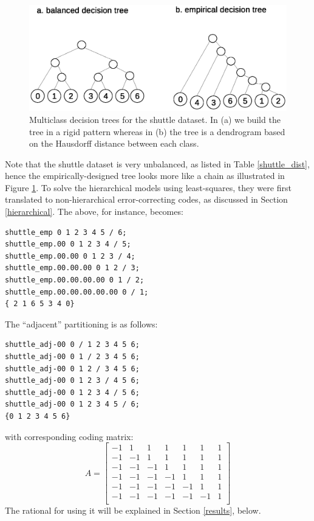 \begin{figure}
	\includegraphics[width=\textwidth]{shuttle_tree.eps}
	\caption{Multiclass decision trees for the shuttle dataset. 
	In (a) we build the tree in a rigid pattern whereas in (b) the tree is a dendrogram based on the Hausdorff distance between each class.}\label{shuttle_tree}
\end{figure}

Note that the shuttle dataset is very unbalanced, 
as listed in Table \ref{shuttle_dist},
hence  the empirically-designed tree looks more like a chain
as illustrated in Figure \ref{shuttle_tree}.
To solve the hierarchical models using least-squares, they were first translated to non-hierarchical error-correcting codes, 
as discussed in Section \ref{hierarchical}.
The above, for instance, becomes:
\begin{verbatim}
shuttle_emp 0 1 2 3 4 5 / 6;
shuttle_emp.00 0 1 2 3 4 / 5;
shuttle_emp.00.00 0 1 2 3 / 4;
shuttle_emp.00.00.00 0 1 2 / 3;
shuttle_emp.00.00.00.00 0 1 / 2;
shuttle_emp.00.00.00.00.00 0 / 1;
{ 2 1 6 5 3 4 0}
\end{verbatim}

The ``adjacent'' partitioning is as follows:
\begin{verbatim}
shuttle_adj-00 0 / 1 2 3 4 5 6;
shuttle_adj-00 0 1 / 2 3 4 5 6;
shuttle_adj-00 0 1 2 / 3 4 5 6;
shuttle_adj-00 0 1 2 3 / 4 5 6;
shuttle_adj-00 0 1 2 3 4 / 5 6;
shuttle_adj-00 0 1 2 3 4 5 / 6;
{0 1 2 3 4 5 6}
\end{verbatim}
with corresponding coding matrix:
\begin{equation}
A = 
\begin{bmatrix}
-1 & 1 & 1 & 1 & 1 & 1 & 1 \\
-1 & -1 & 1 & 1 & 1 & 1 & 1 \\
-1 & -1 & -1 & 1 & 1 & 1 & 1 \\
-1 & -1 & -1 & -1 & 1 & 1 & 1 \\
-1 & -1 & -1 & -1 & -1 & 1 & 1 \\
-1 & -1 & -1 & -1 & -1 & -1 & 1 \\
\end{bmatrix}
	\label{adjacent}
\end{equation}
The rational for using it will be explained in Section \ref{results}, below.

